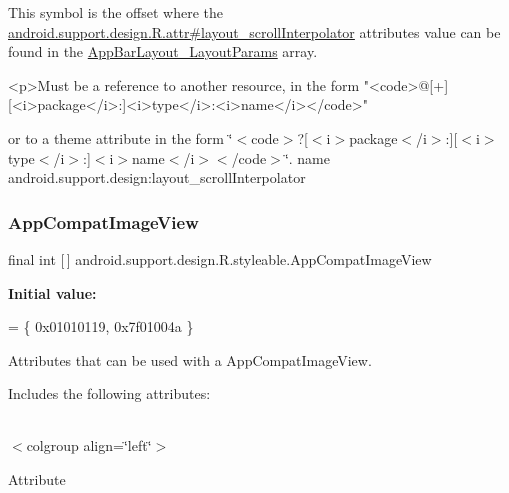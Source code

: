 This symbol is the offset where the \hyperlink{classandroid_1_1support_1_1design_1_1R_1_1attr_ac4c1f8078558d24685155a3802d0746f}{android.\+support.\+design.\+R.\+attr\#layout\+\_\+scroll\+Interpolator} attribute\textquotesingle{}s value can be found in the \hyperlink{classandroid_1_1support_1_1design_1_1R_1_1styleable_af35cb615b571fb6d447bc930baeae71d}{App\+Bar\+Layout\+\_\+\+Layout\+Params} array.

\begin{DoxyVerb}      <p>Must be a reference to another resource, in the form "<code>@[+][<i>package</i>:]<i>type</i>:<i>name</i></code>"
\end{DoxyVerb}
 or to a theme attribute in the form \char`\"{}$<$code$>$?\mbox{[}$<$i$>$package$<$/i$>$\+:\mbox{]}\mbox{[}$<$i$>$type$<$/i$>$\+:\mbox{]}$<$i$>$name$<$/i$>$$<$/code$>$\char`\"{}.  name android.\+support.\+design\+:layout\+\_\+scroll\+Interpolator \mbox{\label{classandroid_1_1support_1_1design_1_1R_1_1styleable_ada1b5e4475936c9e01181fdb4d8cb6c9}} 
\subsubsection{\texorpdfstring{App\+Compat\+Image\+View}{AppCompatImageView}}
{\footnotesize\ttfamily final int \mbox{[}$\,$\mbox{]} android.\+support.\+design.\+R.\+styleable.\+App\+Compat\+Image\+View\hspace{0.3cm}{\ttfamily [static]}}

{\bfseries Initial value\+:}
\begin{DoxyCode}
= \{
            0x01010119, 0x7f01004a
        \}
\end{DoxyCode}
Attributes that can be used with a App\+Compat\+Image\+View. 

Includes the following attributes\+:

\tabulinesep=1mm
\begin{longtabu} spread 0pt [c]{*{0}{|X[-1]}|}
\hline
\end{longtabu}
$<$colgroup align=\char`\"{}left\char`\"{}$>$ 

Attribute

